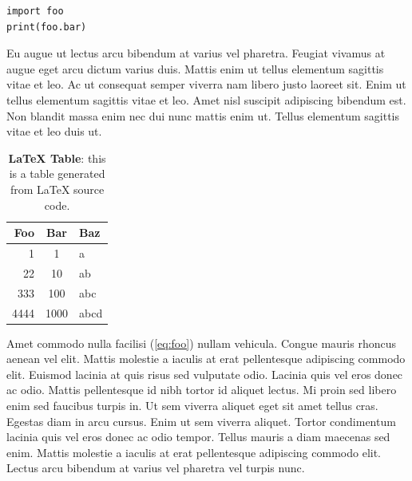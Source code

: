 \begin{verbatim}
import foo
print(foo.bar)
\end{verbatim}

Eu augue ut lectus arcu bibendum at varius vel pharetra. Feugiat vivamus
at augue eget arcu dictum varius duis. Mattis enim ut tellus elementum
sagittis vitae et leo. Ac ut consequat semper viverra nam libero justo
laoreet sit. Enim ut tellus elementum sagittis vitae et leo. Amet nisl
suscipit adipiscing bibendum est. Non blandit massa enim nec dui nunc
mattis enim ut. Tellus elementum sagittis vitae et leo duis ut.

\begin{table}[b!]
\center
\small
\begin{tabular}{rcl}
\toprule
Foo & Bar & Baz \\
\midrule
1 & 1 & a \\
22 & 10 & ab \\
333 & 100 & abc \\
4444 & 1000 & abcd \\
\bottomrule
\end{tabular}
\caption{
\textbf{\LaTeX{} Table}: this is a table generated from \LaTeX{} source
code.
}
\label{tab:latex}
\end{table}

Amet commodo nulla facilisi (\ref{eq:foo}) nullam vehicula. Congue
mauris rhoncus aenean vel elit. Mattis molestie a iaculis at erat
pellentesque adipiscing commodo elit. Euismod lacinia at quis risus sed
vulputate odio. Lacinia quis vel eros donec ac odio. Mattis pellentesque
id nibh tortor id aliquet lectus. Mi proin sed libero enim sed faucibus
turpis in. Ut sem viverra aliquet eget sit amet tellus cras. Egestas
diam in arcu cursus. Enim ut sem viverra aliquet. Tortor condimentum
lacinia quis vel eros donec ac odio tempor. Tellus mauris a diam
maecenas sed enim. Mattis molestie a iaculis at erat pellentesque
adipiscing commodo elit. Lectus arcu bibendum at varius vel pharetra vel
turpis nunc.

